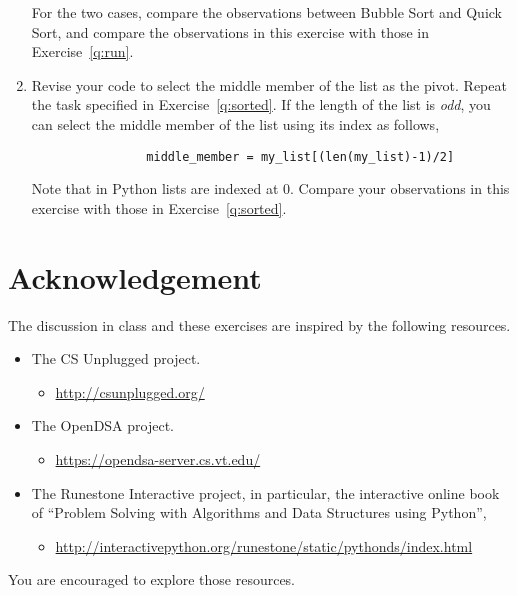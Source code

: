 \documentclass[11pt,letterpaper]{article}
\begin{document}
\begin{enumerate}
\begin{enumerate}
        \end{enumerate}
        For the two cases, compare the observations between Bubble Sort and
        Quick Sort, and compare the observations in this exercise with 
        those in Exercise~\ref{q:run}.


    \item Revise your code to select the middle member of the list as the
        pivot. Repeat the task specified in Exercise~\ref{q:sorted}. If the
        length of the list is {\em odd}, you can select the middle member of
        the list using its index as follows,

                \begin{verbatim}
                middle_member = my_list[(len(my_list)-1)/2]
                \end{verbatim}

        Note that in Python lists are indexed at $0$. Compare your observations
        in this exercise with those in Exercise~\ref{q:sorted}.

\end{enumerate}

\section{Acknowledgement}

The discussion in class and these exercises are inspired by the following
resources. 

\begin{itemize}

    \item The CS Unplugged project.
        \begin{itemize}
            \item \url{http://csunplugged.org/}
        \end{itemize}

    \item The OpenDSA project.
        \begin{itemize}
            \item \url{https://opendsa-server.cs.vt.edu/}
        \end{itemize}

    \item The Runestone Interactive project, in particular, the interactive
        online book of ``Problem Solving with Algorithms and Data Structures
        using Python'',

        \begin{itemize}
            \item \url{http://interactivepython.org/runestone/static/pythonds/index.html}
        \end{itemize}

\end{itemize}
You are encouraged to explore those resources. 
\end{document}
